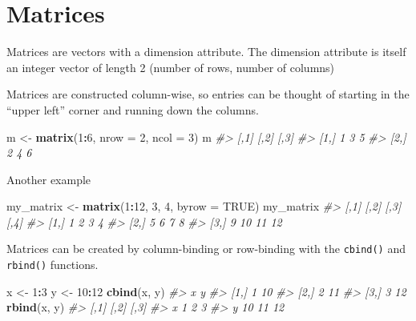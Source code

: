 \documentclass[
]{book}
\newenvironment{Shaded}{\begin{snugshade}}{\end{snugshade}}
\newcommand{\AttributeTok}[1]{\textcolor[rgb]{0.13,0.29,0.53}{#1}}
\newcommand{\CommentTok}[1]{\textcolor[rgb]{0.56,0.35,0.01}{\textit{#1}}}
\newcommand{\ConstantTok}[1]{\textcolor[rgb]{0.56,0.35,0.01}{#1}}
\newcommand{\DecValTok}[1]{\textcolor[rgb]{0.00,0.00,0.81}{#1}}
\newcommand{\FunctionTok}[1]{\textcolor[rgb]{0.13,0.29,0.53}{\textbf{#1}}}
\newcommand{\NormalTok}[1]{#1}
\newcommand{\OtherTok}[1]{\textcolor[rgb]{0.56,0.35,0.01}{#1}}
\newcommand{\SpecialCharTok}[1]{\textcolor[rgb]{0.81,0.36,0.00}{\textbf{#1}}}
\begin{document}
\section*{Matrices}\label{matrices}

Matrices are vectors with a dimension attribute. The dimension attribute is itself an integer vector of length 2 (number of rows, number of columns)

Matrices are constructed column-wise, so entries can be thought of starting in the ``upper left'' corner and running down the columns.

\begin{Shaded}
\begin{Highlighting}[]
\NormalTok{m }\OtherTok{\textless{}{-}} \FunctionTok{matrix}\NormalTok{(}\DecValTok{1}\SpecialCharTok{:}\DecValTok{6}\NormalTok{, }\AttributeTok{nrow =} \DecValTok{2}\NormalTok{, }\AttributeTok{ncol =} \DecValTok{3}\NormalTok{) }
\NormalTok{m}
\CommentTok{\#\textgreater{}      [,1] [,2] [,3]}
\CommentTok{\#\textgreater{} [1,]    1    3    5}
\CommentTok{\#\textgreater{} [2,]    2    4    6}
\end{Highlighting}
\end{Shaded}

Another example

\begin{Shaded}
\begin{Highlighting}[]
\NormalTok{my\_matrix }\OtherTok{\textless{}{-}} \FunctionTok{matrix}\NormalTok{(}\DecValTok{1}\SpecialCharTok{:}\DecValTok{12}\NormalTok{, }\DecValTok{3}\NormalTok{, }\DecValTok{4}\NormalTok{, }\AttributeTok{byrow =} \ConstantTok{TRUE}\NormalTok{)}
\NormalTok{my\_matrix}
\CommentTok{\#\textgreater{}      [,1] [,2] [,3] [,4]}
\CommentTok{\#\textgreater{} [1,]    1    2    3    4}
\CommentTok{\#\textgreater{} [2,]    5    6    7    8}
\CommentTok{\#\textgreater{} [3,]    9   10   11   12}
\end{Highlighting}
\end{Shaded}

Matrices can be created by column-binding or row-binding with the \texttt{cbind()} and \texttt{rbind()} functions.

\begin{Shaded}
\begin{Highlighting}[]
\NormalTok{x }\OtherTok{\textless{}{-}} \DecValTok{1}\SpecialCharTok{:}\DecValTok{3}
\NormalTok{y }\OtherTok{\textless{}{-}} \DecValTok{10}\SpecialCharTok{:}\DecValTok{12}
\FunctionTok{cbind}\NormalTok{(x, y)}
\CommentTok{\#\textgreater{}      x  y}
\CommentTok{\#\textgreater{} [1,] 1 10}
\CommentTok{\#\textgreater{} [2,] 2 11}
\CommentTok{\#\textgreater{} [3,] 3 12}
\FunctionTok{rbind}\NormalTok{(x, y)}
\CommentTok{\#\textgreater{}   [,1] [,2] [,3]}
\CommentTok{\#\textgreater{} x    1    2    3}
\CommentTok{\#\textgreater{} y   10   11   12}
\end{Highlighting}
\end{Shaded}
\end{document}
